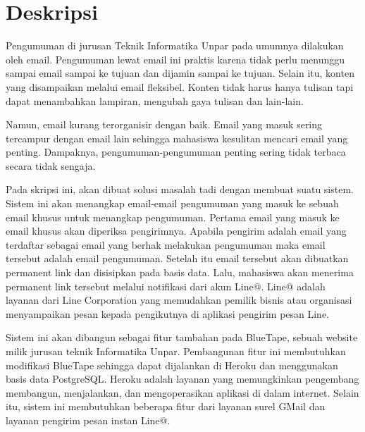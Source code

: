 \documentclass[a4paper,twoside]{article}
\begin{document}
\title{\@judultopik}
\author{\nama \textendash \@npm} 

\newcommand{\nama}{Ellena Angelica}
\newcommand{\@npm}{2015730029}
\newcommand{\@judultopik}{Kolektor Pengumuman Informatika} %
\newcommand{\jumpemb}{1} %
\newcommand{\tanggal}{04/09/2018}


\maketitle


\section{Deskripsi}
Pengumuman di jurusan Teknik Informatika Unpar pada umumnya dilakukan oleh email. Pengumuman lewat email ini praktis karena tidak perlu menunggu sampai email sampai ke tujuan dan dijamin sampai ke tujuan. Selain itu, konten yang disampaikan melalui email fleksibel. Konten tidak harus hanya tulisan tapi dapat menambahkan lampiran, mengubah gaya tulisan dan lain-lain.

Namun, email kurang terorganisir dengan baik. Email yang masuk sering tercampur dengan email lain sehingga mahasiswa kesulitan mencari email yang penting. Dampaknya, pengumuman-pengumuman penting sering tidak terbaca secara tidak sengaja.

Pada skripsi ini, akan dibuat solusi masalah tadi dengan membuat suatu sistem. Sistem ini akan menangkap email-email pengumuman yang masuk ke sebuah email khusus untuk menangkap pengumuman. Pertama email yang masuk ke email khusus akan diperiksa pengirimnya. Apabila pengirim adalah email yang terdaftar sebagai email yang berhak melakukan pengumuman maka email tersebut adalah email pengumuman. Setelah itu email tersebut akan dibuatkan permanent link dan disisipkan pada basis data. Lalu, mahasiswa akan menerima permanent link tersebut melalui notifikasi dari akun Line@. Line@ adalah layanan dari Line Corporation yang memudahkan pemilik bisnis atau organisasi menyampaikan pesan kepada pengikutnya di aplikasi pengirim pesan Line.

Sistem ini akan dibangun sebagai fitur tambahan pada BlueTape, sebuah website milik jurusan teknik Informatika Unpar. Pembangunan fitur ini membutuhkan modifikasi BlueTape sehingga dapat dijalankan di Heroku dan menggunakan basis data PostgreSQL. Heroku adalah layanan yang memungkinkan pengembang membangun, menjalankan, dan mengoperasikan aplikasi di dalam internet. Selain itu, sistem ini membutuhkan beberapa fitur dari layanan surel GMail dan layanan pengirim pesan instan Line@.
\end{document}
